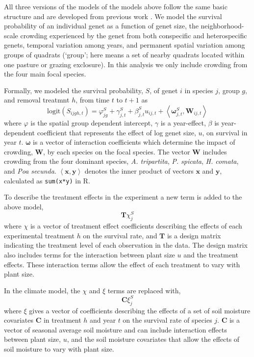 \documentclass[11pt]{article}
\begin{document}
\begin{doublespacing}
All three versions of the models of the models above follow the same basic structure and are developed from previous work \citep{adler_coexistence_2010,chu_large_2015}. We model the survival probability of an individual genet as a function of genet size, the neighborhood-scale crowding experienced by the genet from both conspecific and heterospecific genets, temporal variation among years, and permanent spatial variation among groups of quadrats (`group'; here means a set of nearby quadrats located within one pasture or grazing exclosure). In this analysis we only include crowding from the four main focal species. 

Formally, we modeled the survival probability, $S$, of genet $i$ in species $j$, group $g$, and removal treatmnt $h$, from time $t$ to $t+1$  as
\begin{equation}
\mbox{logit}(S_{ijgh,t}) = \varphi_{jg}^S + \gamma_{j,t}^S  + \beta_{j,t}^S u_{ij,t} +  
\left \langle \boldsymbol{\omega}_{j,t}^S, \boldsymbol{W}_{ij,t} \right \rangle 
\label{eqn:survReg}
\end{equation}
where $\varphi$ is the spatial group dependent intercept, $\gamma$ is a year-effect, $\beta$ is year-dependent coefficient that represents the effect of log genet size, $u$, on survival in year $t$. $\boldsymbol{\omega}$ is a vector of interaction coefficients which determine the impact of crowding, $\boldsymbol{W}$, by each species on the focal species. The vector $\boldsymbol{W}$ includes crowding from the four dominant species, \textit{A. tripartita}, \textit{P. spicata}, \textit{H. comata}, and \textit{Poa secunda}. 
$\left \langle \boldsymbol{x, y} \right \rangle$ denotes the inner product of vectors $\boldsymbol{x}$ and $\boldsymbol{y}$, 
calculated as \texttt{sum(x*y)} in R.

To describe the treatment effects in the experiment a new term is added to the above model,
\begin{equation}
 \boldsymbol{T}\chi_{j}^S
\label{eqn:survT}
\end{equation}
where $\chi$ is a vector of treatment effect coefficients describing the effects of each experimental treatment $h$ on the survival rate, and $\boldsymbol{T}$ is a design matrix indicating the treatment level of each observation in the data. The design matrix also includes terms for the interaction between plant size $u$ and the treatment effects. These interaction terms allow the effect of each treatment to vary with plant size.  

In the climate model, the $\chi$ and $\xi$ terms are replaced with, 
\begin{equation}
\boldsymbol{C}\xi_{j}^S 
\label{eqn:survC}
\end{equation}
where $\xi$ gives a vector of coefficients describing the effects of a set of soil moisture covariates $\boldsymbol{C}$ in treatment $h$ and year $t$ on the survival rate of species $j$. $\boldsymbol{C}$ is a vector of seasonal average soil moisture and can include interaction effects between plant size, $u$, and the soil moisture covariates that allow the effects of soil moisture to vary with plant size. 


\end{doublespacing}
\end{document}
